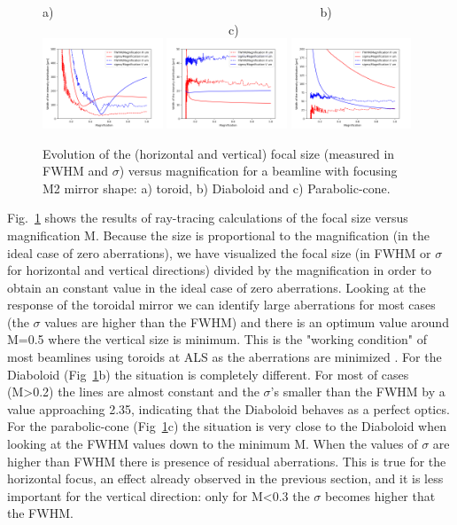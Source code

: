\documentclass{iucr}              %
\begin{document}
\begin{figure}[h]
\flushleft
a)~~~~~~~~~~~~~~~~~~~~~~~~~~~~~~~~~~~~~~~~~~~b)~~~~~~~~~~~~~~~~~~~~~~~~~~~~~~~~~~~~~~~~~~~c)\\
\centering
\includegraphics[width=0.32\textwidth]{figures/scan_toroid.png}
\includegraphics[width=0.32\textwidth]{figures/scan_diaboloid.png}
\includegraphics[width=0.32\textwidth]{figures/scan_parabolic-cone.png}

\caption{\label{fig:scan}
Evolution of the (horizontal and vertical) focal size (measured in FWHM and $\sigma$) versus magnification for a beamline with focusing M2 mirror shape: a) toroid, b) Diaboloid and c) Parabolic-cone. 
}
\end{figure}


Fig.~\ref{fig:scan} shows the results of ray-tracing calculations of the focal size versus magnification M. Because the size is proportional to the magnification (in the ideal case of zero aberrations), we have visualized the focal size (in FWHM or $\sigma$ for horizontal and vertical directions) divided by the magnification in order to obtain an constant value in the ideal case of zero aberrations. Looking at the response of the toroidal mirror we can identify large aberrations for most cases (the $\sigma$ values are higher than the FWHM) and there is an optimum value around M=0.5 where the vertical size is minimum. This is the "working condition" of most beamlines using toroids at ALS as the aberrations are minimized \cite{padmore2000,howells2000}. For the Diaboloid (Fig~\ref{fig:scan}b) the situation is completely different. For most of cases (M>0.2) the lines are almost constant and the $\sigma$'s smaller than the FWHM by a value approaching 2.35, indicating that the Diaboloid behaves as a perfect optics. For the parabolic-cone (Fig~\ref{fig:scan}c) the situation is very close to the Diaboloid when looking at the FWHM values down to the minimum M. When the values of $\sigma$ are higher than FWHM there is presence of residual aberrations. This is true for the horizontal focus, an effect already observed in the previous section, and it is less important for the vertical direction: only for M<0.3 the $\sigma$ becomes higher that the FWHM.  
\end{document}

